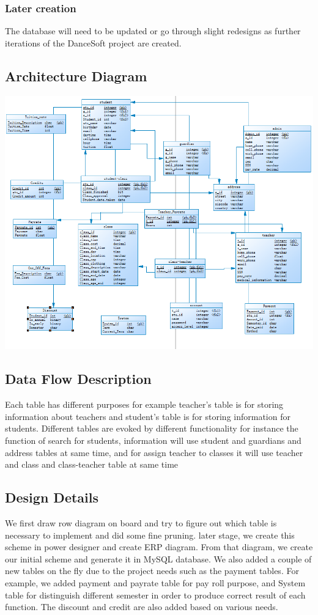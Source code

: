 \subsubsection{Later creation}
The database will need to be updated or go through slight redesigns as further iterations of the DanceSoft project are created.

\subsection{ Architecture  Diagram}

 
\includegraphics[scale=0.8]{pics/database.png}\\

\subsection{Data Flow Description}
Each table has different purposes for example teacher's table is for storing information about teachers and student's table is for storing information for students. Different tables are evoked by different functionality for instance the function of search for students, information will use student and guardians and address tables at same time, and for assign teacher to classes it will use teacher and class and class-teacher table at same time


\subsection{Design Details}
We first draw row diagram on board and try to figure out which table is necessary to implement and did some fine pruning. later stage, we create this scheme in power designer and create ERP diagram. From that diagram, we create our initial scheme and generate it in MySQL database. We also added a couple of new tables on the fly due to the project needs such as the payment tables. For example, we added payment and payrate table for pay roll purpose, and System table for distinguish different semester in order to produce correct result of each function. The discount and credit are also added based on various needs.

